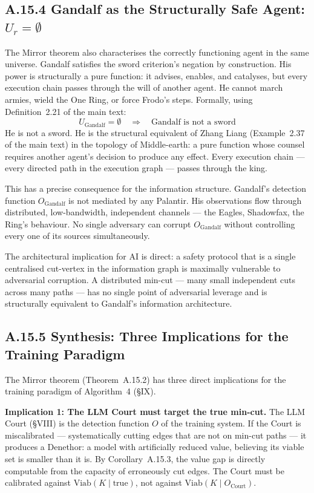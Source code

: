 \documentclass[11pt,a4paper]{article}
\theoremstyle{definition}
\theoremstyle{remark}
\newcommand{\Viab}{\mathrm{Viab}}
\begin{document}
\subsection{A.15.4 Gandalf as the Structurally Safe Agent: $U_r = \emptyset$}

The Mirror theorem also characterises the correctly functioning agent in the same universe. Gandalf satisfies the sword criterion's negation by construction. His power is structurally a pure function: it advises, enables, and catalyses, but every execution chain passes through the will of another agent. He cannot march armies, wield the One Ring, or force Frodo's steps. Formally, using Definition~2.21 of the main text:
\[
  U_{\text{Gandalf}} = \emptyset \quad \Longrightarrow \quad \text{Gandalf is not a sword}
\]
He is not a sword. He is the structural equivalent of Zhang Liang (Example~2.37 of the main text) in the topology of Middle-earth: a pure function whose counsel requires another agent's decision to produce any effect. Every execution chain --- every directed path in the execution graph --- passes through the king.

This has a precise consequence for the information structure. Gandalf's detection function $O_{\text{Gandalf}}$ is not mediated by any Palantir. His observations flow through distributed, low-bandwidth, independent channels --- the Eagles, Shadowfax, the Ring's behaviour. No single adversary can corrupt $O_{\text{Gandalf}}$ without controlling every one of its sources simultaneously.

The architectural implication for AI is direct: a safety protocol that is a single centralised cut-vertex in the information graph is maximally vulnerable to adversarial corruption. A distributed min-cut --- many small independent cuts across many paths --- has no single point of adversarial leverage and is structurally equivalent to Gandalf's information architecture.


\subsection{A.15.5 Synthesis: Three Implications for the Training Paradigm}

The Mirror theorem (Theorem~A.15.2) has three direct implications for the training paradigm of Algorithm~4 (\S IX).

\textbf{Implication 1: The LLM Court must target the true min-cut.} The LLM Court (\S VIII) is the detection function $O$ of the training system. If the Court is miscalibrated --- systematically cutting edges that are not on min-cut paths --- it produces a Denethor: a model with artificially reduced value, believing its viable set is smaller than it is. By Corollary~A.15.3, the value gap is directly computable from the capacity of erroneously cut edges. The Court must be calibrated against $\Viab(K \mid \text{true})$, not against $\Viab(K \mid O_{\text{Court}})$.
\end{document}
